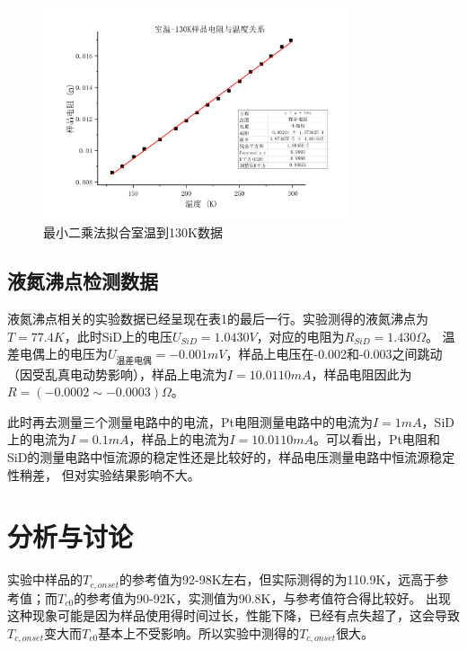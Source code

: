 \documentclass{article}
\begin{document}
    \begin{figure}[htbp]
        \centering
        \includegraphics[width=0.8\textwidth]{室温-130K.jpg}
        \caption{最小二乘法拟合室温到130K数据}
    \end{figure}

    \subsection{液氮沸点检测数据}
    液氮沸点相关的实验数据已经呈现在表1的最后一行。实验测得的液氮沸点为$T=77.4K$，此时SiD上的电压$U_{SiD}=1.0430V$，对应的电阻为$R_{SiD}=1.430\Omega$。
    温差电偶上的电压为$U_{\text{温差电偶}}=-0.001mV$，样品上电压在-0.002和-0.003之间跳动（因受乱真电动势影响），样品上电流为$I=10.0110mA$，样品电阻因此为$R=(-0.0002\sim-0.0003)\Omega$。

    此时再去测量三个测量电路中的电流，Pt电阻测量电路中的电流为$I=1mA$，SiD上的电流为$I=0.1mA$，样品上的电流为$I=10.0110mA$。可以看出，Pt电阻和SiD的测量电路中恒流源的稳定性还是比较好的，样品电压测量电路中恒流源稳定性稍差，
    但对实验结果影响不大。

    \section{分析与讨论}
    实验中样品的$T_{c,onset}$的参考值为92-98K左右，但实际测得的为110.9K，远高于参考值；而$T_{c0}$的参考值为90-92K，实测值为90.8K，与参考值符合得比较好。
    出现这种现象可能是因为样品使用得时间过长，性能下降，已经有点失超了，这会导致$T_{c,onset}$变大而$T_{c0}$基本上不受影响。所以实验中测得的$T_{c,onset}$很大。
\end{document}
